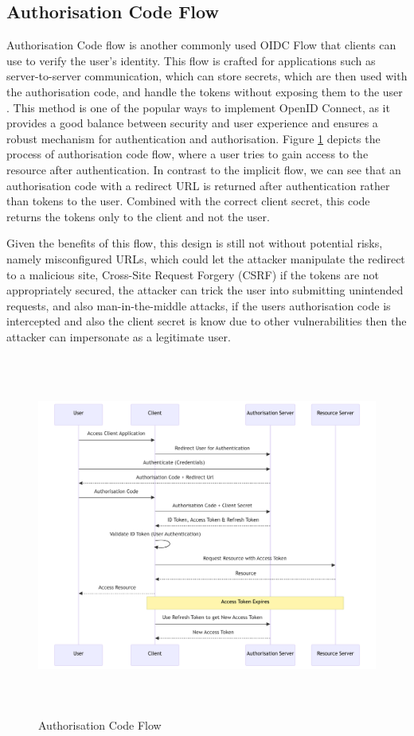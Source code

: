 \subsection{Authorisation Code Flow}
Authorisation Code flow is another commonly used OIDC Flow that clients can use to verify the user's identity. This flow is crafted for applications such as server-to-server communication, which can store secrets, which are then used with the authorisation code, and handle the tokens without exposing them to the user \citep{auth_flow_oidc}. This method is one of the popular ways to implement OpenID Connect, as it provides a good balance between security and user experience and ensures a robust mechanism for authentication and authorisation. Figure \ref{fig:authorisation_flow} depicts the process of authorisation code flow, where a user tries to gain access to the resource after authentication. In contrast to the implicit flow, we can see that an authorisation code with a redirect URL is returned after authentication rather than tokens to the user. Combined with the correct client secret, this code returns the tokens only to the client and not the user. 

Given the benefits of this flow, this design is still not without potential risks, namely misconfigured URLs, which could let the attacker manipulate the redirect to a malicious site, Cross-Site Request Forgery (CSRF) if the tokens are not appropriately secured, the attacker can trick the user into submitting unintended requests, and also man-in-the-middle attacks, if the users authorisation code is intercepted and also the client secret is know due to other vulnerabilities then the attacker can impersonate as a legitimate user.

\begin{figure}[h!]
\centering
\label{fig:authorisation_flow}
\includegraphics[width=\textwidth, height=450px]{pics/authorization_code.pdf}
\caption{Authorisation Code Flow}
\end{figure}

